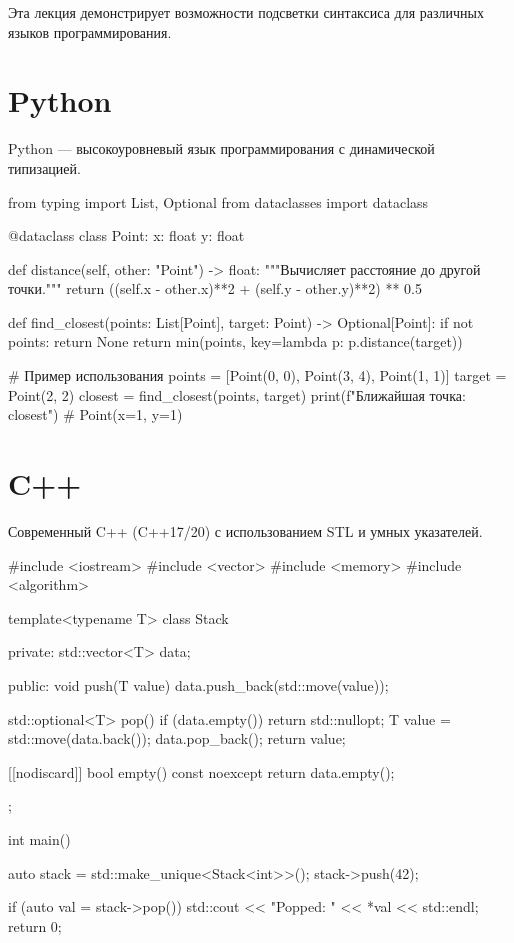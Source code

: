 


Эта лекция демонстрирует возможности подсветки синтаксиса для различных языков программирования.

\section{Python}

Python — высокоуровневый язык программирования с динамической типизацией.

\begin{python}
from typing import List, Optional
from dataclasses import dataclass

@dataclass
class Point:
    x: float
    y: float

    def distance(self, other: "Point") -> float:
        """Вычисляет расстояние до другой точки."""
        return ((self.x - other.x)**2 + (self.y - other.y)**2) ** 0.5

def find_closest(points: List[Point], target: Point) -> Optional[Point]:
    if not points:
        return None
    return min(points, key=lambda p: p.distance(target))

# Пример использования
points = [Point(0, 0), Point(3, 4), Point(1, 1)]
target = Point(2, 2)
closest = find_closest(points, target)
print(f"Ближайшая точка: {closest}")  # Point(x=1, y=1)
\end{python}

\section{C++}

Современный C++ (C++17/20) с использованием STL и умных указателей.

\begin{cpp}
#include <iostream>
#include <vector>
#include <memory>
#include <algorithm>

template<typename T>
class Stack {
private:
    std::vector<T> data;

public:
    void push(T value) {
        data.push_back(std::move(value));
    }

    std::optional<T> pop() {
        if (data.empty()) return std::nullopt;
        T value = std::move(data.back());
        data.pop_back();
        return value;
    }

    [[nodiscard]] bool empty() const noexcept {
        return data.empty();
    }
};

int main() {
    auto stack = std::make_unique<Stack<int>>();
    stack->push(42);

    if (auto val = stack->pop()) {
        std::cout << "Popped: " << *val << std::endl;
    }
    return 0;
}
\end{cpp}

